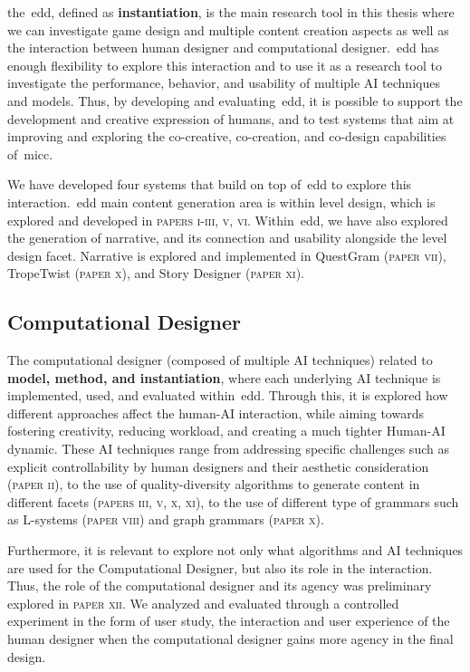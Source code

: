 the~\acrlong{edd}, defined as \textbf{instantiation}, is the main research tool in this thesis where we can investigate game design and multiple content creation aspects as well as the interaction between human designer and computational designer.~\acrshort{edd} has enough flexibility to explore this interaction and to use it as a research tool to investigate the performance, behavior, and usability of multiple AI techniques and models. Thus, by developing and evaluating~\acrshort{edd}, it is possible to support the development and creative expression of humans, and to test systems that aim at improving and exploring the co-creative, co-creation, and co-design capabilities of~\acrshort{micc}.

We have developed four systems that build on top of~\acrshort{edd} to explore this interaction.~\acrshort{edd} main content generation area is within level design, which is explored and developed in \textsc{papers i-iii, v, vi}. Within~\acrshort{edd}, we have also explored the generation of narrative, and its connection and usability alongside the level design facet. Narrative is explored and implemented in QuestGram (\textsc{paper vii}), TropeTwist (\textsc{paper x}), and Story Designer (\textsc{paper xi}).


\subsection{Computational Designer}

The computational designer (composed of multiple AI techniques) related to \textbf{model, method, and instantiation}, where each underlying AI technique is implemented, used, and evaluated within~\acrshort{edd}. Through this, it is explored how different approaches affect the human-AI interaction, while aiming towards fostering creativity, reducing workload, and creating a much tighter Human-AI dynamic. These AI techniques range from addressing specific challenges such as explicit controllability by human designers and their aesthetic consideration (\textsc{paper ii}), to the use of quality-diversity algorithms to generate content in different facets (\textsc{papers iii, v, x, xi}), to the use of different type of grammars such as L-systems (\textsc{paper viii}) and graph grammars (\textsc{paper x}).

Furthermore, it is relevant to explore not only what algorithms and AI techniques are used for the Computational Designer, but also its role in the interaction. Thus, the role of the computational designer and its agency was preliminary explored in \textsc{paper xii}. We analyzed and evaluated through a controlled experiment in the form of user study, the interaction and user experience of the human designer when the computational designer gains more agency in the final design. 


